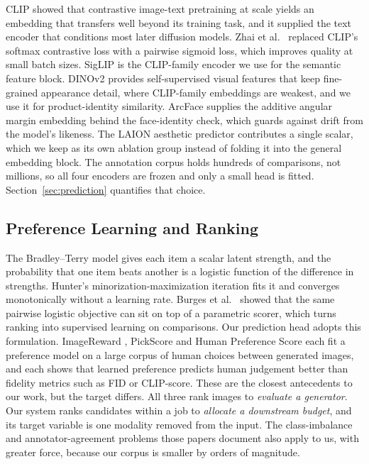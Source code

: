 \documentclass[conference]{IEEEtran}
\begin{document}
CLIP \cite{radford2021clip} showed that contrastive image-text pretraining at scale
yields an embedding that transfers well beyond its training task, and it supplied
the text encoder that conditions most later diffusion models. Zhai et al.\
\cite{zhai2023siglip} replaced CLIP's softmax contrastive loss with a pairwise
sigmoid loss, which improves quality at small batch sizes. SigLIP is the CLIP-family
encoder we use for the semantic feature block. DINOv2 \cite{oquab2023dinov2}
provides self-supervised visual features that keep fine-grained appearance detail,
where CLIP-family embeddings are weakest, and we use it for product-identity
similarity. ArcFace \cite{deng2019arcface} supplies the additive angular margin
embedding behind the face-identity check, which guards against drift from the
model's likeness. The LAION aesthetic predictor \cite{schuhmann2022laion}
contributes a single scalar, which we keep as its own ablation group instead of
folding it into the general embedding block. The annotation corpus holds hundreds of
comparisons, not millions, so all four encoders are frozen and only a small head is
fitted. Section~\ref{sec:prediction} quantifies that choice.

\subsection{Preference Learning and Ranking}

The Bradley--Terry model \cite{bradley1952} gives each item a scalar latent
strength, and the probability that one item beats another is a logistic function of
the difference in strengths. Hunter's minorization-maximization iteration
\cite{hunter2004mm} fits it and converges monotonically without a learning rate.
Burges et al.\ \cite{burges2005ranknet} showed that the same pairwise logistic
objective can sit on top of a parametric scorer, which turns ranking into supervised
learning on comparisons. Our prediction head adopts this formulation. ImageReward
\cite{xu2023imagereward}, PickScore \cite{kirstain2023pickapic} and Human Preference
Score \cite{wu2023hps} each fit a preference model on a large corpus of human
choices between generated images, and each shows that learned preference predicts
human judgement better than fidelity metrics such as FID or CLIP-score. These are
the closest antecedents to our work, but the target differs. All three rank images
to \emph{evaluate a generator}. Our system ranks candidates within a job to
\emph{allocate a downstream budget}, and its target variable is one modality removed
from the input. The class-imbalance and annotator-agreement problems those papers
document also apply to us, with greater force, because our corpus is smaller by
orders of magnitude.
\end{document}
